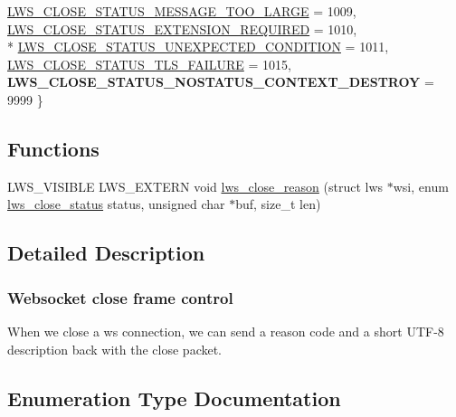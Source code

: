 \begin{DoxyCompactItemize}
\hyperlink{group__wsclose_ggae399c571df32ba532c0ca67da9284985a2e1f0113494a58e762eed3d22e7080d8}{L\+W\+S\+\_\+\+C\+L\+O\+S\+E\+\_\+\+S\+T\+A\+T\+U\+S\+\_\+\+M\+E\+S\+S\+A\+G\+E\+\_\+\+T\+O\+O\+\_\+\+L\+A\+R\+GE} = 1009, 
\hyperlink{group__wsclose_ggae399c571df32ba532c0ca67da9284985ac6a161822783ee873be1c66f48d14e0e}{L\+W\+S\+\_\+\+C\+L\+O\+S\+E\+\_\+\+S\+T\+A\+T\+U\+S\+\_\+\+E\+X\+T\+E\+N\+S\+I\+O\+N\+\_\+\+R\+E\+Q\+U\+I\+R\+ED} = 1010, 
\\*
\hyperlink{group__wsclose_ggae399c571df32ba532c0ca67da9284985ad0869604d79e13700ae5d196a431b350}{L\+W\+S\+\_\+\+C\+L\+O\+S\+E\+\_\+\+S\+T\+A\+T\+U\+S\+\_\+\+U\+N\+E\+X\+P\+E\+C\+T\+E\+D\+\_\+\+C\+O\+N\+D\+I\+T\+I\+ON} = 1011, 
\hyperlink{group__wsclose_ggae399c571df32ba532c0ca67da9284985ad2b477a91c8445bf34ecd43977f9b390}{L\+W\+S\+\_\+\+C\+L\+O\+S\+E\+\_\+\+S\+T\+A\+T\+U\+S\+\_\+\+T\+L\+S\+\_\+\+F\+A\+I\+L\+U\+RE} = 1015, 
{\bfseries L\+W\+S\+\_\+\+C\+L\+O\+S\+E\+\_\+\+S\+T\+A\+T\+U\+S\+\_\+\+N\+O\+S\+T\+A\+T\+U\+S\+\_\+\+C\+O\+N\+T\+E\+X\+T\+\_\+\+D\+E\+S\+T\+R\+OY} = 9999
 \}
\end{DoxyCompactItemize}
\subsection*{Functions}
\begin{DoxyCompactItemize}
\item 
L\+W\+S\+\_\+\+V\+I\+S\+I\+B\+LE L\+W\+S\+\_\+\+E\+X\+T\+E\+RN void \hyperlink{group__wsclose_gaa1c863415d1783cd8de7938aa6efa262}{lws\+\_\+close\+\_\+reason} (struct lws $\ast$wsi, enum \hyperlink{group__wsclose_gae399c571df32ba532c0ca67da9284985}{lws\+\_\+close\+\_\+status} status, unsigned char $\ast$buf, size\+\_\+t len)
\end{DoxyCompactItemize}


\subsection{Detailed Description}
\subsubsection*{Websocket close frame control}

When we close a ws connection, we can send a reason code and a short U\+T\+F-\/8 description back with the close packet. 

\subsection{Enumeration Type Documentation}

